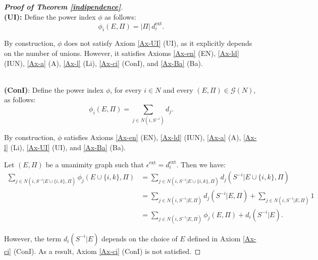 \documentclass[preprint,11pt,authoryear]{elsarticle}
\theoremstyle{plain}
\begin{document}
\begin{proof}[\bf Proof of Theorem \ref{indipendence}]
	
	
	
	
	\noindent\vspace{.5\baselineskip}\\
	\textbf{(UI):} 
	Define the power index $\phi$ as follows:
	\begin{equation*}
		\phi_i(E, \Pi) = |\Pi|\,d_i^{\text{ext}}.
	\end{equation*}
	
	By construction, $\phi$ does not satisfy Axiom \ref{Ax-UI} (UI), as it explicitly depends on the number of unions. However, it satisfies Axioms \ref{Ax-en} (EN), \ref{Ax-ld} (IUN), \ref{Ax-a} (A), \ref{Ax-l} (Li), \ref{Ax-ci} (ConI), and \ref{Ax-Ba} (Ba).
	
	
	
	\noindent\vspace{.5\baselineskip}\\
	\textbf{(ConI)}: 
	Define the power index $\phi$, for every $i \in N$ and every $(E, \Pi) \in \mathcal{G}(N)$, as follows:
	\begin{equation*}
		\phi_i(E, \Pi) = \sum_{j \in N(i, S^{-i})} d_j.
	\end{equation*}
	
	By construction, $\phi$ satisfies Axioms \ref{Ax-en} (EN),
	\ref{Ax-ld} (IUN),
	\ref{Ax-a} (A), \ref{Ax-l} (Li),  \ref{Ax-UI} (UI), and \ref{Ax-Ba} (Ba).
	
	Let $(E, \Pi)$ be a unanimity graph such that $\epsilon^{\text{ext}} = d_i^{\text{ext}}$. Then we have:
	\begin{align*}
		\sum_{j \in N(i, S^{-i}|E \cup \{i,k\}, \Pi)} \phi_j (E \cup \{i,k\}, \Pi)
		&= \sum_{j \in N(i, S^{-i}|E \cup \{i,k\}, \Pi)} d_j (S^{-i}|E \cup \{i,k\}, \Pi) \\
		&= \sum_{j \in N(i, S^{-i}|E, \Pi)} d_j (S^{-i}|E, \Pi) + \sum_{j \in N(i, S^{-i}|E, \Pi)} 1 \\
		&= \sum_{j \in N(i, S^{-i}|E, \Pi)} \phi_j (E, \Pi) + d_i (S^{-i}|E).
	\end{align*}
	
	However, the term $d_i (S^{-i}|E)$ depends on the choice of $E$ %
	defined in Axiom \ref{Ax-ci} (ConI). As a result, Axiom \ref{Ax-ci} (ConI) is not satisfied.
	
	
	
	
	

\end{proof}
\end{document}
